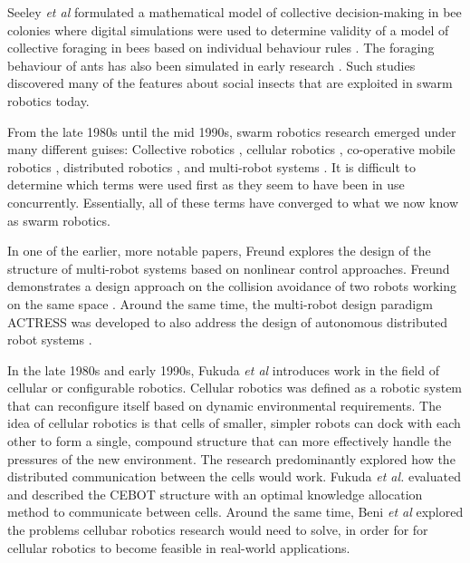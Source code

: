 Seeley \textit{et al }\cite{seeley1991collective} formulated a mathematical model of collective decision-making in bee colonies where digital simulations were used to determine validity of a model of collective foraging in bees based on individual behaviour rules \cite{de1998modelling}. The foraging behaviour of ants has also been simulated in early research \cite{lopez1987optimal}. Such studies discovered many of the features about social insects that are exploited in swarm robotics today.

From the late 1980s until the mid 1990s, swarm robotics research emerged under many different guises: Collective robotics \cite{kube1993collective}, cellular robotics \cite{freund1984design}, co-operative mobile robotics \cite{cao1997cooperative}, distributed robotics \cite{asama2013distributed}, and multi-robot systems \cite{mataric1995cooperative}. It is difficult to determine which terms were used first as they seem to have been in use concurrently. Essentially, all of these terms have converged to what we now know as swarm robotics.

In one of the earlier, more notable papers, Freund explores the design of the structure of multi-robot systems based on nonlinear control approaches. Freund demonstrates a design approach on the collision avoidance of two robots working on the same space \cite{freund1984design,freund1986pathfinding}. Around the same time, the multi-robot design paradigm ACTRESS was developed to also address the design of autonomous distributed robot systems \cite{asama1989design}. 

In the late 1980s and early 1990s, Fukuda \textit{et al} \cite{fukuda1989communication, fukuda1990analysis} introduces work in the field of cellular or configurable robotics. Cellular robotics was defined as a robotic system that can reconfigure itself based on dynamic environmental requirements. The idea of cellular robotics is that cells of smaller, simpler robots can dock with each other to form a single, compound structure that can more effectively handle the pressures of the new environment. The research predominantly explored how the distributed communication between the cells would work. Fukuda \textit{et al.} evaluated and described the CEBOT structure with an optimal knowledge allocation method to communicate between cells. Around the same time, Beni \textit{et al} \cite{beni1991theoretical} explored the problems cellubar robotics research would need to solve, in order for for cellular robotics to become feasible in real-world applications.

